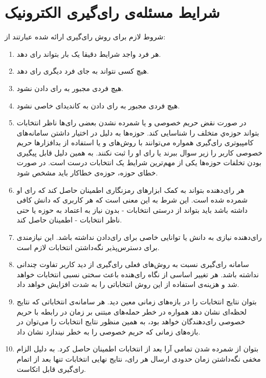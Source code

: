\section{شرایط مسئله‌ی رای‌گیری الکترونیک}
شروط لازم برای روش‌ رای‌گیری ارائه شده عبارتند از:  
\begin{enumerate}
	\item 
	هر فرد واجد شرایط دقیقا یک بار بتواند رای دهد.
	\item 
	هیچ کسی نتواند به جای فرد دیگری رای دهد.
	\item 
	هیچ فردی مجبور به رای دادن نشود.
	\item 
	هیچ فردی مجبور به رای دادن به کاندیدای خاصی نشود.
	\item 
	در صورت نقض حریم خصوصی و یا شمرده نشدن بعضی رای‌ها ناظر انتخابات بتواند حوزه‌ي متخلف را شناسایی کند. حوزه‌ها به دلیل در اختیار داشتن سامانه‌های کامپیوتری رای‌گیری همواره می‌توانند با روش‌های 
	و یا استفاده از بد‌افزار‌ها حریم خصوصی کاربر را زیر سوال ببرند یا رای او را ثبت نکنند. به همین دلیل قابل پیگیری بودن تخلفات حوزه‌ها یکی از مهم‌ترین شرایط یک انتخابات درست است. در صورت خطای حوزه، حوزه‌ی خطاکار باید مشخص شود.
	\item 
	هر رای‌دهنده بتواند به کمک ابزارهای رمزنگاری اطمینان حاصل کند که رای او شمرده شده است. این شرط به این معنی است که هر کاربری که دانش کافی داشته باشد باید بتواند از درستی انتخابات - بدون نیاز به اعتماد به حوزه یا حتی ناظر انتخابات - اطمینان حاصل کند. 
	\item
	رای‌دهنده نیازی به دانش یا توانایی خاصی برای رای‌دادن نداشته باشد. این نیازمندی برای دسترس‌پذیر نگه‌داشتن انتخابات لازم است.
	\item
	سامانه رای‌گیری نسبت به روش‌های فعلی رای‌گیری از دید کاربر تفاوت چندانی نداشته باشد. هر تغییر اساسی از نگاه رای‌هنده باعث سختی نسبی انتخابات خواهد شد و هزینه‌ی  استفاده از این روش انتخاباتی را به شدت افزایش خواهد داد.
	\item 
	بتوان نتایج انتخابات را در بازه‌های زمانی معین دید. هر سامانه‌ی انتخاباتی که نتایج لحظه‌ای نشان دهد همواره در خطر حمله‌های مبتنی بر زمان در رابطه با حریم خصوصی رای‌دهندگان خواهد بود، به همین منظور نتایج انتخابات را می‌توان در بازه‌های زمانی که حریم خصوصی را به خطر نیندازد نشان داد.
	\item 
	بتوان از شمرده شدن تمامی آرا بعد از انتخابات اطمینان حاصل کرد. به دلیل الزام مخفی نگه‌داشتن زمان حدودی ارسال هر رای، نتایج نهایی انتخابات تنها بعد از اتمام رای‌گیری قابل اتکاست.
\end{enumerate}

